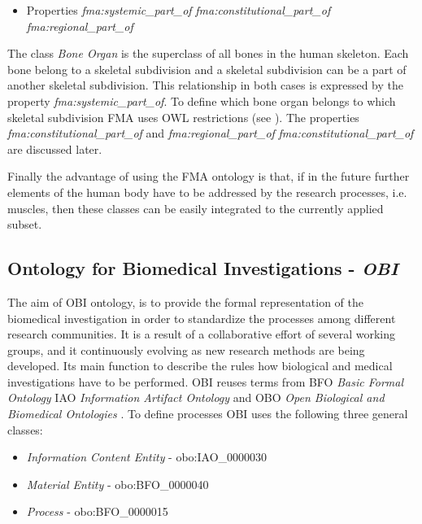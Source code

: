 \begin{itemize}
	\item{Properties}
		\subitem \textit{fma:systemic\_part\_of}
		\subitem \textit{fma:constitutional\_part\_of}
		\subitem \textit{fma:regional\_part\_of}
\end{itemize}

The class \textit{Bone Organ} is the superclass of all bones in the human skeleton. Each bone belong to a skeletal subdivision and a skeletal subdivision can be a part of another skeletal subdivision. This relationship in both cases is expressed by the property \textit{fma:systemic\_part\_of}. To define which bone organ belongs to which skeletal subdivision FMA uses OWL restrictions (see ). The properties \textit{fma:constitutional\_part\_of} and \textit{fma:regional\_part\_of} \textit{fma:constitutional\_part\_of} are discussed later.


Finally the advantage of using the FMA ontology is that, if in the future further elements of the human body have to be addressed by the research processes, i.e. muscles, then these classes can be easily integrated to the currently applied subset.

\subsection{Ontology for Biomedical Investigations - \textit{OBI}} \label{obi}


The aim of OBI ontology, is to provide the formal representation of the biomedical investigation in order to standardize the processes among different research communities. It is a result of a collaborative effort of several working groups, and it continuously evolving as new research methods are being developed. Its main function to describe the rules how biological and medical investigations have to be performed. OBI reuses terms from BFO \textit{Basic Formal Ontology} IAO \textit{Information Artifact Ontology} and  OBO \textit{Open Biological and Biomedical Ontologies} \cite{10.1371/journal.pone.0154556}. To define processes OBI uses the following three general classes:

\begin{itemize}
	\item  \textit{Information Content Entity} - obo:IAO\_0000030
	\item  \textit{Material Entity} - obo:BFO\_0000040
	\item  \textit{Process} - obo:BFO\_0000015
\end{itemize}

